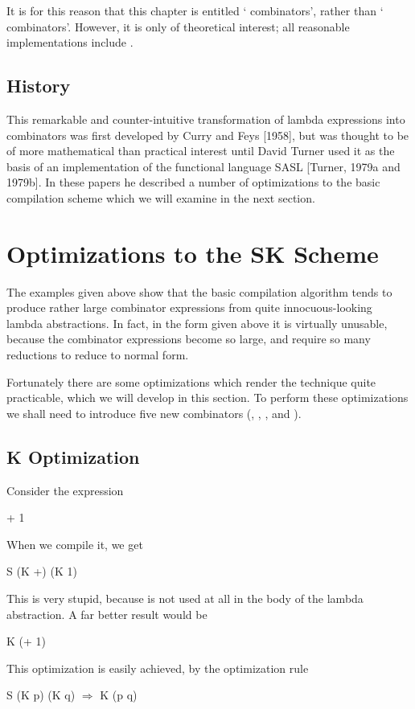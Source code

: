 \noindent
It is for this reason that this chapter is entitled ` combinators', rather than
` combinators'. However, it is only of theoretical interest; all reasonable
implementations include .

\subsection{History}

This remarkable and counter-intuitive transformation of lambda expressions
into combinators was first developed by Curry and Feys [1958], but was
thought to be of more mathematical than practical interest until David Turner
used it as the basis of an implementation of the functional language SASL
[Turner, 1979a and 1979b]. In these papers he described a number of
optimizations to the basic compilation scheme which we will examine in the
next section.

\section{Optimizations to the {\sffamily SK} Scheme}

The examples given above show that the basic compilation algorithm tends to
produce rather large combinator expressions from quite innocuous-looking
lambda abstractions. In fact, in the form given above it is virtually unusable,
because the combinator expressions become so large, and require so many
reductions to reduce to normal form.

Fortunately there are some optimizations which render the technique quite
practicable, which we will develop in this section. To perform these
optimizations we shall need to introduce five new combinators (, , , 
and ).

\subsection{K Optimization}

Consider the expression
\begin{mlcoded}
    + 1
\end{mlcoded}
When we compile it, we get
\begin{mlcoded}
    S (K +) (K 1)
\end{mlcoded}
This is very stupid, because  is not used at all in the body of the lambda
abstraction. A far better result would be
\begin{mlcoded}
    K (+ 1)
\end{mlcoded}
This optimization is easily achieved, by the optimization rule
\begin{mlcoded}
    S (K p) (K q) $\Rightarrow$ K (p q)
\end{mlcoded}

